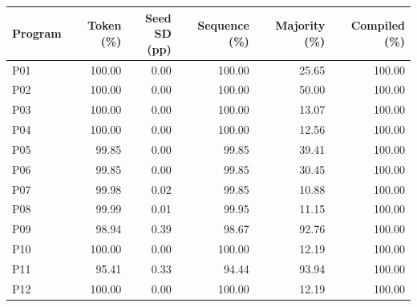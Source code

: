 \begin{center}\small
\begin{tabular}{@{}lrrrrr@{}}
\toprule
Program & Token (\%) & \shortstack{Seed SD\\(pp)} & Sequence (\%) & Majority (\%) & Compiled (\%) \\
\midrule
P01 & 100.00 & 0.00 & 100.00 & 25.65 & 100.00 \\
P02 & 100.00 & 0.00 & 100.00 & 50.00 & 100.00 \\
P03 & 100.00 & 0.00 & 100.00 & 13.07 & 100.00 \\
P04 & 100.00 & 0.00 & 100.00 & 12.56 & 100.00 \\
P05 & 99.85 & 0.00 & 99.85 & 39.41 & 100.00 \\
P06 & 99.85 & 0.00 & 99.85 & 30.45 & 100.00 \\
P07 & 99.98 & 0.02 & 99.85 & 10.88 & 100.00 \\
P08 & 99.99 & 0.01 & 99.95 & 11.15 & 100.00 \\
P09 & 98.94 & 0.39 & 98.67 & 92.76 & 100.00 \\
P10 & 100.00 & 0.00 & 100.00 & 12.19 & 100.00 \\
P11 & 95.41 & 0.33 & 94.44 & 93.94 & 100.00 \\
P12 & 100.00 & 0.00 & 100.00 & 12.19 & 100.00 \\
\bottomrule
\end{tabular}
\end{center}
